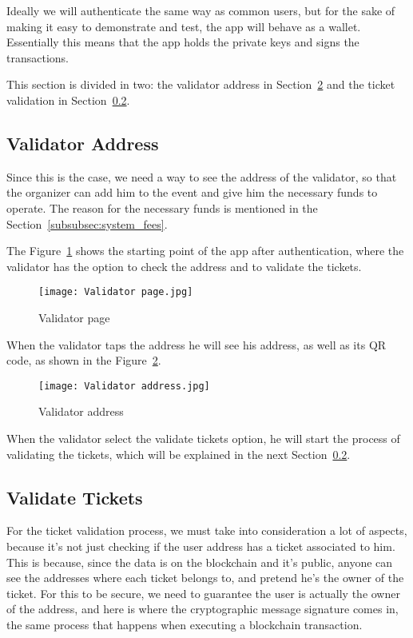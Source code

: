Ideally we will authenticate the same way as common users, but for the sake of
making it easy to demonstrate and test, the app will behave as a wallet.
Essentially this means that the app holds the private keys and signs the
transactions.

This section is divided in two: the validator address in
Section~\ref{fig:validator_address} and the ticket validation in
Section~\ref{subsec:validate_tickets}.

\subsection{Validator Address}\label{subsec:validator_address}

Since this is the case, we need a way to see the address of the validator, so
that the organizer can add him to the event and give him the necessary funds to
operate. The reason for the necessary funds is mentioned in the
Section~\ref{subsubsec:system_fees}.

The Figure~\ref{fig:validator_page} shows the starting point of the app after
authentication, where the validator has the option to check the address and to
validate the tickets.

\begin{figure}[H]
	\texttt{[image: Validator page.jpg]}
	\centering
	\caption{Validator page}\label{fig:validator_page}
\end{figure}

When the validator taps the address he will see his address, as well as its QR
code, as shown in the Figure~\ref{fig:validator_address}.

\begin{figure}[H]
	\texttt{[image: Validator address.jpg]}
	\centering
	\caption{Validator address}\label{fig:validator_address}
\end{figure}

When the validator select the validate tickets option, he will start the
process of validating the tickets, which will be explained in the next
Section~\ref{subsec:validate_tickets}.

\subsection{Validate Tickets}\label{subsec:validate_tickets}

For the ticket validation process, we must take into consideration a lot of
aspects, because it's not just checking if the user address has a ticket
associated to him. This is because, since the data is on the blockchain and
it's public, anyone can see the addresses where each ticket belongs to, and
pretend he's the owner of the ticket. For this to be secure, we need to
guarantee the user is actually the owner of the address, and here is where the
cryptographic message signature comes in, the same process that happens when
executing a blockchain transaction.

